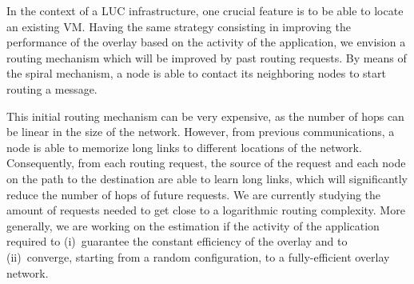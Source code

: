 In the context of a LUC infrastructure, one crucial feature is to be able to
locate an existing VM. Having the same strategy consisting in improving the
performance of the overlay based on the activity of the application, we envision a
routing mechanism which will be improved by past routing requests. By means of the
spiral mechanism, a node is able to contact its neighboring
nodes to start routing a message.

This initial routing mechanism can be very expensive, as the number of hops can
be linear in the size of the network. However, from previous communications, a
node is able to memorize long links to different locations of the
network. Consequently, from each routing request, the source of the request and
each node on the path to the destination are able to learn long links, which
will significantly reduce the number of hops of future requests. We are
currently studying the amount of requests needed to get close to a logarithmic
routing complexity. More generally, we are working on the estimation if the
activity of the application required to (i)~guarantee the constant efficiency of
the overlay and to (ii)~converge, starting from a random configuration, to a
fully-efficient overlay network.





